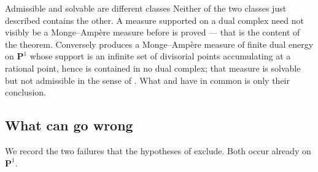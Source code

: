 \begin{warning}{Admissible and solvable are different classes}
Neither of the two classes just described contains the other.  A measure
supported on a dual complex need not visibly be a Monge--Amp\`ere measure
before  is proved --- that is the content of the
theorem.  Conversely
 produces a Monge--Amp\`ere measure of
finite dual energy on \(\mathbf P^1\) whose support is an infinite set of
divisorial points accumulating at a rational point, hence is contained in no
dual complex; that measure is solvable but not admissible in the sense of
.  What
 and
 have in common is only their conclusion.
\end{warning}

\subsection{What can go wrong}
\label{sec:ch28-what-goes-wrong}

We record the two failures that the hypotheses of
 exclude.  Both occur already on
\(\mathbf P^1\).

